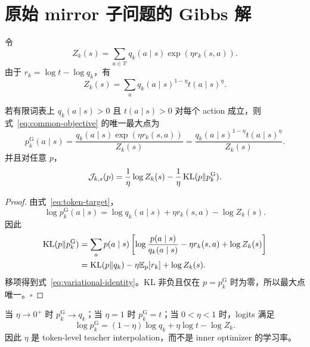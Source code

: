 \section{原始 mirror 子问题的 Gibbs 解}

令
\begin{equation*}
 Z_k(s)=\sum_{a\in\mathcal V} q_k(a\mid s)\exp(\eta r_k(s,a)).
\end{equation*}
由于 $r_k=\log t-\log q_k$，有
\begin{equation}\label{eq:token-partition}
 Z_k(s)=\sum_a q_k(a\mid s)^{1-\eta} t(a\mid s)^\eta.
\end{equation}

\begin{theorem}
\label{thm:token-target}
若有限词表上 $ q_k(a\mid s)>0$ 且 $ t(a\mid s)>0$ 对每个 action 成立，则式~\eqref{eq:common-objective} 的唯一最大点为
\begin{equation}\label{eq:token-target}
  p_k^{\mathrm G}(a\mid s)=
 \frac{ q_k(a\mid s)\exp(\eta r_k(s,a))}{Z_k(s)}
 =\frac{ q_k(a\mid s)^{1-\eta} t(a\mid s)^\eta}{Z_k(s)}.
\end{equation}
并且对任意 $p$，
\begin{equation}\label{eq:variational-identity}
 \mathcal J_{k,s}(p)
 =\frac{1}{\eta}\log Z_k(s)
 -\frac{1}{\eta}\KL(p\Vert  p_k^{\mathrm G}).
\end{equation}
\end{theorem}

\begin{proof}
由式~\eqref{eq:token-target}，
\begin{equation*}
 \log  p_k^{\mathrm G}(a\mid s)=\log q_k(a\mid s)+\eta r_k(s,a)-\log Z_k(s).
\end{equation*}
因此
\begin{align*}
 \KL(p\Vert  p_k^{\mathrm G})
 &=\sum_a p(a\mid s)\left[
 \log\frac{p(a\mid s)}{ q_k(a\mid s)}
 -\eta r_k(s,a)+\log Z_k(s)\right]\\
 &=\KL(p\Vert q_k)-\eta\E_p[r_k]+\log Z_k(s).
\end{align*}
移项得到式~\eqref{eq:variational-identity}。KL 非负且仅在 $p= p_k^{\mathrm G}$ 时为零，所以最大点唯一。\hfill$\square$
\end{proof}

\begin{corollary}[几何插值与极限]
当 $\eta\to0^+$ 时 $ p_k^{\mathrm G}\to q_k$；当 $\eta=1$ 时 $ p_k^{\mathrm G}= t$；当 $0<\eta<1$ 时，logits 满足
\begin{equation*}
 \log  p_k^{\mathrm G}=(1-\eta)\log q_k+\eta\log t-\log Z_k.
\end{equation*}
因此 $\eta$ 是 token-level teacher interpolation，而不是 inner optimizer 的学习率。
\end{corollary}


